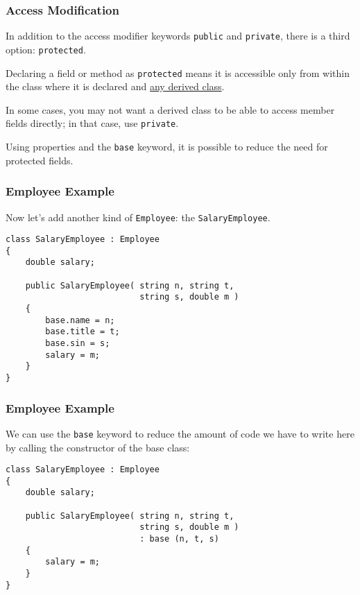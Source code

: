 \begin{frame}
\frametitle{Access Modification}
In addition to the access modifier keywords \texttt{public} and \texttt{private}, there is a third option: \texttt{protected}.

Declaring a field or method as \texttt{protected} means it is accessible only from within the class where it is declared and \underline{any derived class}.

In some cases, you may not want a derived class to be able to access member fields directly; in that case, use \texttt{private}.

Using properties and the \texttt{base} keyword, it is possible to reduce the need for protected fields.

\end{frame}

\begin{frame}[fragile]
\frametitle{Employee Example}

Now let's add another kind of \texttt{Employee}: the \texttt{SalaryEmployee}.

\begin{verbatim}
class SalaryEmployee : Employee
{
    double salary;

    public SalaryEmployee( string n, string t, 
                           string s, double m )
    {
        base.name = n;
        base.title = t;
        base.sin = s;
        salary = m;
    }
}
\end{verbatim}

\end{frame}

\begin{frame}[fragile]
\frametitle{Employee Example}

We can use the \texttt{base} keyword to reduce the amount of code we have to write here by calling the constructor of the base class:

\begin{verbatim}
class SalaryEmployee : Employee
{
    double salary;

    public SalaryEmployee( string n, string t, 
                           string s, double m ) 
                           : base (n, t, s)
    {
        salary = m;
    }
}
\end{verbatim}

\end{frame}


